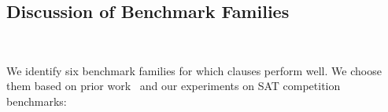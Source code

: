 




\subsection{Discussion of Benchmark Families}~\label{subsec:eval-discussion}

We identify six benchmark families for which \pr clauses perform well. We choose
them based on prior work~\cite{prelearn} and our experiments on SAT competition
benchmarks:

